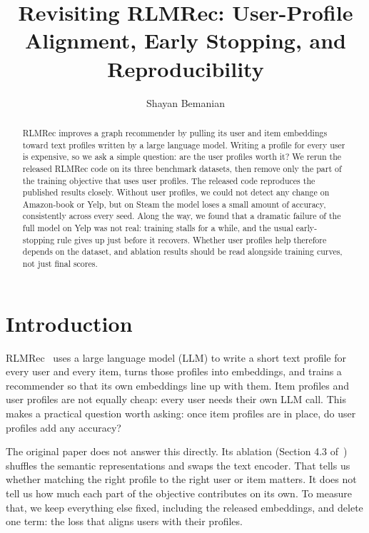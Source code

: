\documentclass[runningheads]{llncs}
\title{Revisiting RLMRec: User-Profile Alignment, Early Stopping, and Reproducibility}
\author{Shayan Bemanian}
\institute{}
\begin{document}
\maketitle

\begin{abstract}
RLMRec improves a graph recommender by pulling its user and item embeddings
toward text profiles written by a large language model. Writing a profile for
every user is expensive, so we ask a simple question: are the user profiles
worth it? We rerun the released RLMRec code on its three benchmark datasets,
then remove only the part of the training objective that uses user profiles.
The released code reproduces the published results closely. Without user
profiles, we could not detect any change on Amazon-book or Yelp, but on Steam
the model loses a small amount of accuracy, consistently across every seed.
Along the way, we found that a dramatic failure of the full model on Yelp was
not real: training stalls for a while, and the usual early-stopping rule gives
up just before it recovers. Whether user profiles help therefore depends on
the dataset, and ablation results should be read alongside training curves,
not just final scores.

\end{abstract}

\section{Introduction}
RLMRec~\cite{rlmrec} uses a large language model (LLM) to write a short text
profile for every user and every item, turns those profiles into embeddings,
and trains a recommender so that its own embeddings line up with them. Item
profiles and user profiles are not equally cheap: every user needs their own
LLM call. This makes a practical question worth asking: once item profiles are
in place, do user profiles add any accuracy?

The original paper does not answer this directly. Its ablation (Section 4.3
of~\cite{rlmrec}) shuffles the semantic representations and swaps the text
encoder. That tells us whether matching the right profile to the right user or
item matters. It does not tell us how much each part of the objective
contributes on its own. To measure that, we keep everything else fixed,
including the released embeddings, and delete one term: the loss that aligns
users with their profiles.
\end{document}
